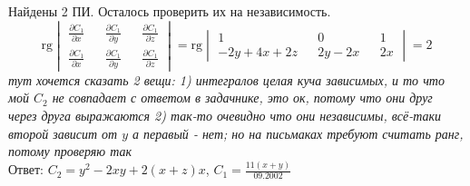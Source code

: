 \documentclass{article}
\newcommand{\rg}{\text{rg}}
\begin{document}
Найдены 2 ПИ. Осталось проверить их на независимость.
\begin{equation*}
    \rg \begin{vmatrix}
        \frac{\partial C_1}{\partial x} && \frac{\partial C_1}{\partial y} && \frac{\partial C_1}{\partial z}\\
        \frac{\partial C_1}{\partial x} && \frac{\partial C_1}{\partial y} && \frac{\partial C_1}{\partial z}
    \end{vmatrix}= \rg \begin{vmatrix}
        1&&0&&1\\
        -2y+4x+2z &&2y-2x && 2x
    \end{vmatrix} = 2
\end{equation*}
 \textcolor[rgb]{0.480469,0.566406,0.480469}{\textit{тут хочется сказать 2 вещи: 1) интегралов целая куча зависимых, и то что мой $C_2$ не совпадает с ответом в задачнике, это ок, потому что они друг через друга выражаются 2) так-то очевидно что они независимы, всё-таки второй зависит от $y$ а перавый - нет; но на письмаках требуют считать ранг, потому проверяю так}}\\
 Ответ: $C_2=y^2-2xy+2(x+z)x$,  $C_1=\frac{11(x+y)}{09.2002}$
\end{document}
